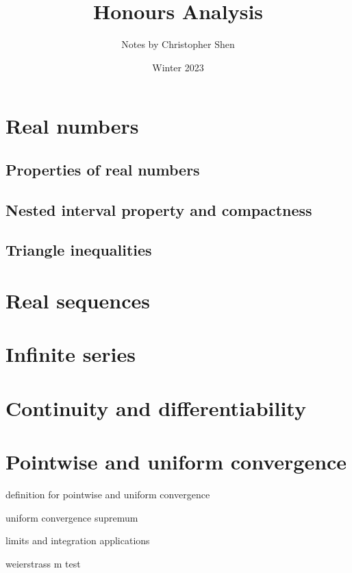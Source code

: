 \documentclass{article}
\title{Honours Analysis}
\author{Notes by Christopher Shen}
\date{Winter 2023}
\begin{document}
\maketitle
\newpage

\tableofcontents
\newpage

\pagestyle{fancy}
\fancyhead{}

\section{Real numbers}

\subsection{Properties of real numbers}

\subsection{Nested interval property and compactness}
    
\subsection{Triangle inequalities}

\section{Real sequences}

\section{Infinite series}
    
\section{Continuity and differentiability}

\newpage
    
\section{Pointwise and uniform convergence}
definition for pointwise and uniform convergence
    
uniform convergence supremum
    
limits and integration applications
    
weierstrass m test
\end{document}
